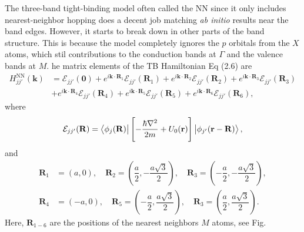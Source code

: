 \documentclass{report}
\newcommand{\f}[2]{\dfrac{#1}{#2}}
\begin{document}
The three-band tight-binding model often called the \ac{NN} since it only includes nearest-neighbor hopping does a decent job matching \textit{ab initio} results near the band edges. However, it starts to break down in other parts of the band structure. This is because the model completely ignores the $p$ orbitals from the $X$ atoms, which stil contributions to the conduction bands at $\Gamma$ and the valence bands at $M$. he matrix elements of the TB Hamiltonian Eq (2.6) are
\begin{equation}
	\begin{aligned}
		H_{jj'}^{\text{NN}}(\mathbf{k})
		 & = \mathcal{E}_{jj'}(\mathbf{0}) + e^{i\mathbf{k}\cdot \mathbf{R}_{1}}\mathcal{E}_{jj'}(\mathbf{R}_{1}) + e^{i\mathbf{k}\cdot \mathbf{R}_{2}}\mathcal{E}_{jj'}(\mathbf{R}_{2}) + e^{i\mathbf{k}\cdot \mathbf{R}_{3}}\mathcal{E}_{jj'}(\mathbf{R}_{3}) \\
		 & + e^{i\mathbf{k}\cdot \mathbf{R}_{4}}\mathcal{E}_{jj'}(\mathbf{R}_{4}) + e^{i\mathbf{k}\cdot \mathbf{R}_{5}}\mathcal{E}_{jj'}(\mathbf{R}_{5}) + e^{i\mathbf{k}\cdot \mathbf{R}_{6}}\mathcal{E}_{jj'}(\mathbf{R}_{6}),
	\end{aligned}
\end{equation}
where
\begin{gather}
	\mathcal{E}_{jj'}(\mathbf{R}) = \bra{\phi_{j}(\mathbf{R})} \left[-\frac{\hbar \nabla^{2}}{2m} + U_{0} (\mathbf{r})\right] \ket{\phi_{j'}(\mathbf{r-R})},
\end{gather}
and
\begin{equation}
	\begin{aligned}
		\mathbf{R}_{1} & = (a,0), \quad \mathbf{R}_{2} = \left(\f{a}{2}, - \f{a\sqrt{3}}{2}\right), \quad \mathbf{R}_{3} = \left(-\f{a}{2},-\f{a\sqrt{3}}{2}\right), \\
		\mathbf{R}_{4} & = (-a,0), \quad \mathbf{R}_{5} = \left(-\f{a}{2}, \f{a\sqrt{3}}{2}\right), \quad \mathbf{R}_{3} = \left(\f{a}{2},\f{a\sqrt{3}}{2}\right).
	\end{aligned}
\end{equation}
Here, $\mathbf{R}_{1-6}$ are the positions of the nearest neighbors $M$ atoms, see Fig.
\end{document}
